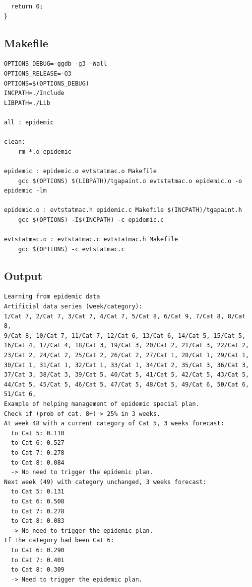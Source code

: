 \documentclass[12pt, a4paper]{article}
\begin{document}
\begin{scriptsize}
\begin{ttfamily}
\begin{lstlisting}
  return 0;
}
\end{lstlisting}
\end{ttfamily}
\end{scriptsize}

\subsection{Makefile}

\begin{scriptsize}
\begin{ttfamily}
\begin{lstlisting}
OPTIONS_DEBUG=-ggdb -g3 -Wall
OPTIONS_RELEASE=-O3 
OPTIONS=$(OPTIONS_DEBUG)
INCPATH=./Include
LIBPATH=./Lib

all : epidemic

clean:
	rm *.o epidemic
	
epidemic : epidemic.o evtstatmac.o Makefile
	gcc $(OPTIONS) $(LIBPATH)/tgapaint.o evtstatmac.o epidemic.o -o epidemic -lm

epidemic.o : evtstatmac.h epidemic.c Makefile $(INCPATH)/tgapaint.h
	gcc $(OPTIONS) -I$(INCPATH) -c epidemic.c

evtstatmac.o : evtstatmac.c evtstatmac.h Makefile
	gcc $(OPTIONS) -c evtstatmac.c
\end{lstlisting}
\end{ttfamily}
\end{scriptsize}

\subsection{Output}

\begin{scriptsize}
\begin{ttfamily}
\begin{lstlisting}
Learning from epidemic data
Artificial data series (week/category):
1/Cat 7, 2/Cat 7, 3/Cat 7, 4/Cat 7, 5/Cat 8, 6/Cat 9, 7/Cat 8, 8/Cat 8, 
9/Cat 8, 10/Cat 7, 11/Cat 7, 12/Cat 6, 13/Cat 6, 14/Cat 5, 15/Cat 5, 
16/Cat 4, 17/Cat 4, 18/Cat 3, 19/Cat 3, 20/Cat 2, 21/Cat 3, 22/Cat 2, 
23/Cat 2, 24/Cat 2, 25/Cat 2, 26/Cat 2, 27/Cat 1, 28/Cat 1, 29/Cat 1, 
30/Cat 1, 31/Cat 1, 32/Cat 1, 33/Cat 1, 34/Cat 2, 35/Cat 3, 36/Cat 3, 
37/Cat 3, 38/Cat 3, 39/Cat 5, 40/Cat 5, 41/Cat 5, 42/Cat 5, 43/Cat 5, 
44/Cat 5, 45/Cat 5, 46/Cat 5, 47/Cat 5, 48/Cat 5, 49/Cat 6, 50/Cat 6, 
51/Cat 6, 
Example of helping management of epidemic special plan.
Check if (prob of cat. 8+) > 25% in 3 weeks.
At week 48 with a current category of Cat 5, 3 weeks forecast:
  to Cat 5: 0.110
  to Cat 6: 0.527
  to Cat 7: 0.278
  to Cat 8: 0.084
  -> No need to trigger the epidemic plan.
Next week (49) with category unchanged, 3 weeks forecast:
  to Cat 5: 0.131
  to Cat 6: 0.508
  to Cat 7: 0.278
  to Cat 8: 0.083
  -> No need to trigger the epidemic plan.
If the category had been Cat 6:
  to Cat 6: 0.290
  to Cat 7: 0.401
  to Cat 8: 0.309
  -> Need to trigger the epidemic plan.
\end{lstlisting}
\end{ttfamily}
\end{scriptsize}
\end{document}
